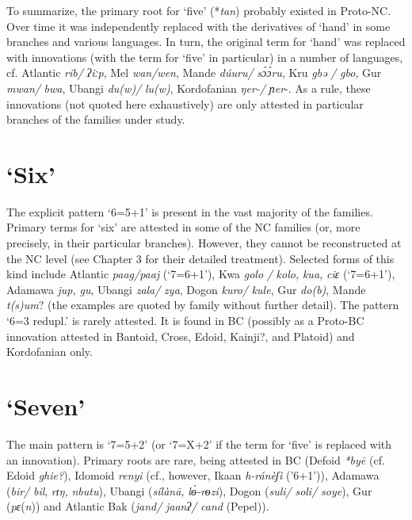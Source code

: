 To summarize, the primary root for ‘five’ (*\textit{tan}) probably existed in Proto-NC. Over time it was independently replaced with the derivatives of ‘hand’ in some branches and various languages. In turn, the original term for ‘hand’ was replaced with innovations (with the term for ‘five’ in particular) in a number of languages, cf. Atlantic \textit{rib/} \textit{ʔiːp}, Mel \textit{wan/wen}, Mande \textit{d{\'{u}}uru/} \textit{s{\'{ɔ}}{\'{ɔ}}ru}, Kru \textit{gbə} \textit{/} \textit{gbo}, Gur \textit{mwan/} \textit{bwa}, Ubangi \textit{du(w)/} \textit{lu(w)}, Kordofanian \textit{ŋer-/} \textit{ɲer}-. As a rule, these innovations (not quoted here exhaustively) are only attested in particular branches of the families under study. 

\clearpage
\section{‘Six’}%
 
The explicit pattern ‘6=5+1’ is present in the vast majority of the families. Primary terms for ‘six’ are attested in some of the NC families (or, more precisely, in their particular branches). However, they cannot be reconstructed at the NC level (see Chapter 3 for their detailed treatment). Selected forms of this kind include Atlantic \textit{paag/paaj} (‘7=6+1’), Kwa \textit{golo} \textit{/} \textit{kolo,} \textit{kua,} \textit{ciɛ} (‘7=6+1’), Adamawa \textit{jup,} \textit{gu}, Ubangi \textit{zala/} \textit{zya}, Dogon \textit{kuro/} \textit{kule}, Gur \textit{do(b)}, Mande \textit{t(s)um}? (the examples are quoted by family without further detail). The pattern ‘6=3 redupl.’ is rarely attested. It is found in BC (possibly as a Proto-BC innovation attested in Bantoid, Cross, Edoid, Kainji?, and Platoid) and Kordofanian only.

\clearpage
\section{‘Seven’}%
 
The main pattern is ‘7=5+2’ (or ‘7=X+2’ if the term for ‘five’ is replaced with an innovation). Primary roots are rare, being attested in BC (Defoid \textit{*by{\={e}}} (cf. Edoid \textit{ghie?}), Idomoid \textit{renyi} (cf., however, Ikaan \textit{h-ránèʃì} ('6+1’)), Adamawa (\textit{bir/} \textit{bil}, \textit{rɪŋ,} \textit{nbutu}), Ubangi (\textit{sílàn{\={a}},} \textit{l{\`{ɵ}}-rɵzi}), Dogon (\textit{suli/} \textit{soli/} \textit{soye}), Gur (\textit{pɛ}(\textit{n})) and Atlantic Bak (\textit{jand/} \textit{jaanʔ/} \textit{cand} (Pepel)).

